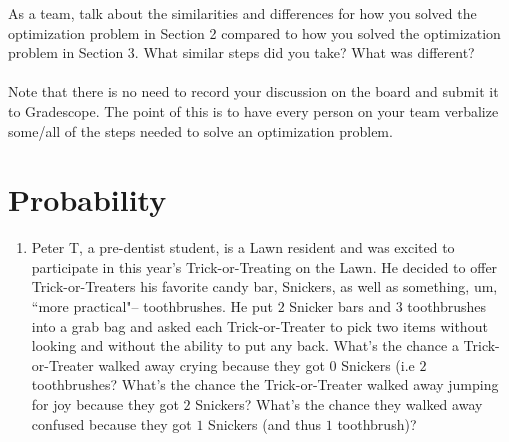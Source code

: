 \documentclass[10pt]{article}
\begin{document}
 As a team, talk about the similarities and differences for how you solved the optimization problem in Section 2 compared to how you solved the optimization problem in Section 3. What similar steps did you take? What was different?\\\\
Note that there is no need to record your discussion on the board and submit it to Gradescope. The point of this is to have every person on your team verbalize some/all of the steps needed to solve an optimization problem.

\newpage

\section{Probability}
\begin{enumerate}
\item Peter T, a pre-dentist student,  is a Lawn resident and was excited to participate in this year's Trick-or-Treating on the Lawn. He decided to offer Trick-or-Treaters his favorite candy bar, Snickers, as well as something, um, ``more practical"-- toothbrushes.   He put $2$ Snicker bars and $3$ toothbrushes into a grab bag and asked each Trick-or-Treater to pick two items without looking and without the ability to put any back. What's the chance a Trick-or-Treater  walked away crying because they got  $0$ Snickers (i.e $2$ toothbrushes?  What's the chance the Trick-or-Treater walked away jumping for joy because they got $2$ Snickers? What's the chance they walked away confused because they got $1$ Snickers (and thus $1$ toothbrush)?


\end{enumerate}
\end{document}
